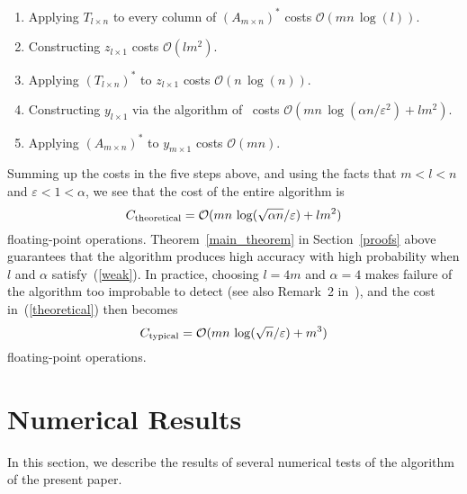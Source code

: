 \documentclass[letterpaper,12pt]{article}
\def\epsilon{\varepsilon}
\def\bigoh{\mathcal{O}}
\begin{document}
\begin{enumerate}
\item Applying $T_{l \times n}$ to every column of $(A_{m \times n})^*$
      costs $\bigoh(mn \, \log(l))$.
\item Constructing $z_{l \times 1}$ costs $\bigoh(l m^2)$.
\item Applying $(T_{l \times n})^*$ to $z_{l \times 1}$
      costs $\bigoh(n \, \log(n))$.
\item Constructing $y_{l \times 1}$ via the algorithm of~\cite{rokhlin-tygert}
      costs $\bigoh(mn \, \log(\alpha n/\epsilon^2) + l m^2)$.
\item Applying $(A_{m \times n})^*$ to $y_{m \times 1}$ costs $\bigoh(mn)$.
\end{enumerate}

Summing up the costs in the five steps above,
and using the facts that $m < l < n$ and $\epsilon < 1 < \alpha$,
we see that the cost of the entire algorithm is
\begin{equation}
\label{theoretical}
C_{\rm theoretical} = \bigoh(mn \, \log(\sqrt{\alpha n}/\epsilon) + l m^2)
\end{equation}
floating-point operations.
Theorem~\ref{main_theorem} in Section~\ref{proofs} above
guarantees that the algorithm produces
high accuracy with high probability when $l$ and $\alpha$ satisfy~(\ref{weak}).
In practice, choosing $l = 4m$ and $\alpha = 4$ makes failure
of the algorithm too improbable to detect
(see also Remark~2 in~\cite{rokhlin-tygert}),
and the cost in~(\ref{theoretical}) then becomes
\begin{equation}
C_{\rm typical} = \bigoh(mn \, \log(\sqrt{n}/\epsilon) + m^3)
\end{equation}
floating-point operations.



\section{Numerical Results}
\label{numerical}

In this section, we describe the results of several numerical tests
of the algorithm of the present paper.
\end{document}
